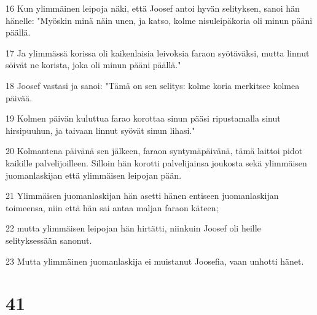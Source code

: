 \par 16 Kun ylimmäinen leipoja näki, että Joosef antoi hyvän selityksen, sanoi hän hänelle: "Myöskin minä näin unen, ja katso, kolme nisuleipäkoria oli minun pääni päällä.
\par 17 Ja ylimmässä korissa oli kaikenlaisia leivoksia faraon syötäväksi, mutta linnut söivät ne korista, joka oli minun pääni päällä."
\par 18 Joosef vastasi ja sanoi: "Tämä on sen selitys: kolme koria merkitsee kolmea päivää.
\par 19 Kolmen päivän kuluttua farao korottaa sinun pääsi ripustamalla sinut hirsipuuhun, ja taivaan linnut syövät sinun lihasi."
\par 20 Kolmantena päivänä sen jälkeen, faraon syntymäpäivänä, tämä laittoi pidot kaikille palvelijoilleen. Silloin hän korotti palvelijainsa joukosta sekä ylimmäisen juomanlaskijan että ylimmäisen leipojan pään.
\par 21 Ylimmäisen juomanlaskijan hän asetti hänen entiseen juomanlaskijan toimeensa, niin että hän sai antaa maljan faraon käteen;
\par 22 mutta ylimmäisen leipojan hän hirtätti, niinkuin Joosef oli heille selityksessään sanonut.
\par 23 Mutta ylimmäinen juomanlaskija ei muistanut Joosefia, vaan unhotti hänet.

\chapter{41}

